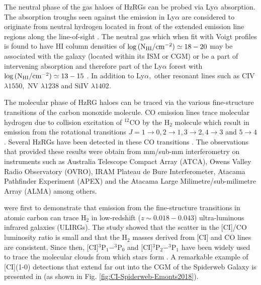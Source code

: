 \documentclass[10pt,a4paper]{article}
\begin{document}
The neutral phase of the gas haloes of HzRGs can be probed via Ly$\alpha$ absorption. The absorption troughs seen against the emission in Ly$\alpha$ are considered to originate from neutral hydrogen located in front of the extended emission line regions along the line-of-sight \citep{rottgering1995,vanojik1997}. The neutral gas which when fit with Voigt profiles is found to have HI column densities of $\log{ (\rm N_{HI} /cm^{-2}) } \simeq 18-20$ may be associated with the galaxy (located within its ISM or CGM) or be a part of intervening absorption and therefore part of the Ly$\alpha$ forest with $\log{ (\rm N_{HI} /cm^{-2}) } \simeq 13-15$  \citep{wilman2004}. In addition to Ly$\alpha,$ other resonant lines such as CIV $\lambda1550,$ NV $\lambda1238$ and SiIV $\lambda1402.$

The molecular phase of HzRG haloes can be traced via the various fine-structure transitions of the carbon monoxide molecule. CO emission lines trace molecular hydrogen due to collision excitation of $^12$CO by the H$_2$ molecule which result in emission from the rotational transitions $J=1\rightarrow0, 2\rightarrow1, 3\rightarrow2, 4\rightarrow3$ and $5\rightarrow4$ \citep{SolomonvandenBout2005}. Several HzRGs have been detected in these CO transitions \citep{Scoville1997,Alloin2000,deBreuck2003a,Papadopoulos2000,
Greve2004,deBreuck2005,Klamer2005,Ivison2008,Emonts2014,emonts2015,Gullberg2016b}. The observations that provided these results were obtain from mm/sub-mm interferometry on instruments such as Australia Telescope Compact Array (ATCA), Owens Valley Radio Observatory (OVRO), IRAM Plateau de Bure Interferometer, Atacama Pathfinder Experiment (APEX) and the Atacama Large Milimetre/sub-milimetre Array (ALMA) among others. 

\citet{PapadopoulosGreve2004} were first to demonstrate that emission from the fine-structure transitions in atomic carbon can trace H$_2$ in low-redshift ($z\sim0.018 - 0.043$) ultra-luminous infrared galaxies (ULIRGs). The study showed that the scatter in the [CI]/CO luminosity ratio is small and that the H$_2$ masses derived from [CI] and CO lines are consistent. Since then, [CI]$^3$P$_1 - ^3$P$_0$ and [CI]$^3$P$_2 - ^3$P$_1$ have been widely used to trace the molecular clouds from which stars form \citep{Alaghband-Zadeh2013,Bothwell2017,Popping2017,Andreani2018,Lelli2018,emonts2018,
Nesvadba2019,Man2019}. A remarkable example of [CI](1-0) detections that extend far out into the CGM of the Spiderweb Galaxy is presented in \citet{emonts2018} (as shown in Fig. \ref{fig:CI-Spiderweb-Emonts2018}). 
\end{document}
